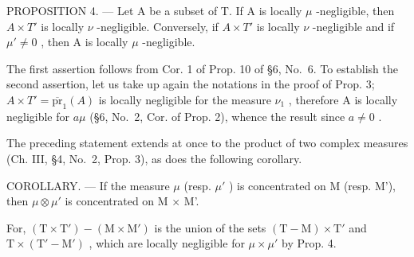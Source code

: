 PROPOSITION 4. --- Let A be a subset of T. If A is locally \(\mu\) -negligible, then \(A \times T'\) is locally \(\nu\) -negligible. Conversely, if \(A \times T'\) is locally \(\nu\) -negligible and if \(\mu' \neq 0\) , then A is locally \(\mu\) -negligible.

The first assertion follows from Cor. 1 of Prop. 10 of §6, No.~6. To establish the second assertion, let us take up again the notations in the proof of Prop. 3; \(A \times T' = \overline{\text{pr}}_{1}(A)\) is locally negligible for the measure \(\nu_{1}\) , therefore A is locally negligible for \(a\mu\) (§6, No.~2, Cor. of Prop. 2), whence the result since \(a \neq 0\) .

The preceding statement extends at once to the product of two complex measures (Ch. III, §4, No.~2, Prop. 3), as does the following corollary.

COROLLARY. --- If the measure \(\mu\) (resp. \(\mu'\) ) is concentrated on M (resp. M'), then \(\mu \otimes \mu'\) is concentrated on M × M'.

For, \((\mathrm{T} \times \mathrm{T}') - (\mathrm{M} \times \mathrm{M}')\) is the union of the sets \((\mathrm{T} - \mathrm{M}) \times \mathrm{T}'\) and \(\mathrm{T} \times (\mathrm{T}' - \mathrm{M}')\) , which are locally negligible for \(\mu \times \mu'\) by Prop. 4.

